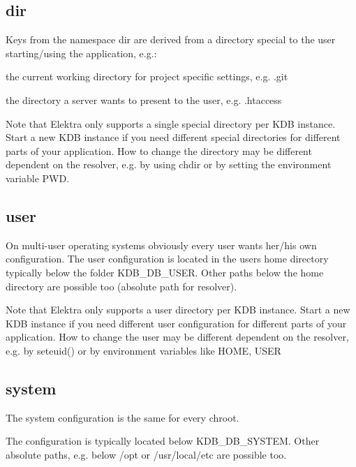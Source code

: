 \subsection*{dir}

Keys from the namespace {\ttfamily dir} are derived from a directory special to the user starting/using the application, e.\+g.\+:


\begin{DoxyItemize}
\item the current working directory for project specific settings, e.\+g. {\ttfamily .git}
\item the directory a server wants to present to the user, e.\+g. {\ttfamily .htaccess}
\end{DoxyItemize}

Note that Elektra only supports a single special directory per K\+D\+B instance. Start a new K\+D\+B instance if you need different special directories for different parts of your application. How to change the directory may be different dependent on the resolver, e.\+g. by using chdir or by setting the environment variable P\+W\+D.

\subsection*{user}

On multi-\/user operating systems obviously every user wants her/his own configuration. The user configuration is located in the users home directory typically below the folder K\+D\+B\+\_\+\+D\+B\+\_\+\+U\+S\+E\+R. Other paths below the home directory are possible too (absolute path for resolver).

Note that Elektra only supports a user directory per K\+D\+B instance. Start a new K\+D\+B instance if you need different user configuration for different parts of your application. How to change the user may be different dependent on the resolver, e.\+g. by seteuid() or by environment variables like H\+O\+M\+E, U\+S\+E\+R

\subsection*{system}

The system configuration is the same for every chroot.

The configuration is typically located below K\+D\+B\+\_\+\+D\+B\+\_\+\+S\+Y\+S\+T\+E\+M. Other absolute paths, e.\+g. below /opt or /usr/local/etc are possible too.

